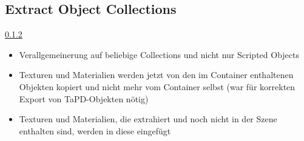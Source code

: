 \documentclass[12pt,a4paper]{scrartcl}
\begin{document}
\subsection{Extract Object Collections}
\underline{0.1.2}
\begin{itemize}
	\item Verallgemeinerung auf beliebige Collections und nicht nur
		Scripted Objects
	\item Texturen und Materialien werden jetzt von den im Container
		enthaltenen Objekten kopiert und nicht mehr vom Container selbst
		(war für korrekten Export von TaPD-Objekten nötig)
	\item Texturen und Materialien, die extrahiert und noch nicht in der
		Szene enthalten sind, werden in diese eingefügt
\end{itemize}
\end{document}
